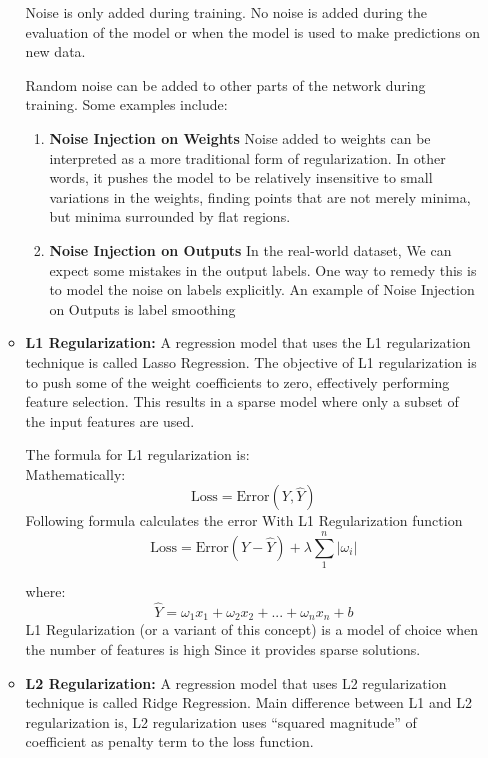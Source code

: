 \begin{itemize}
\begin{itemize}
    Noise is only added during training. No noise is added during the evaluation of the model or when the model is used to make predictions on new data.
    
    Random noise can be added to other parts of the network during training. Some examples include:
    
    \begin{enumerate}
        \item \textbf{Noise Injection on Weights}  Noise added to weights can be interpreted as a more traditional form of regularization.
        In other words, it pushes the model to be relatively insensitive to small variations in the weights, finding points that are not merely minima, but minima surrounded by flat regions.
        \item \textbf{Noise Injection on Outputs}  In the real-world dataset, We can expect some mistakes in the output labels. One way to remedy this is to model the noise on labels explicitly.
        An example of Noise Injection on Outputs is label smoothing
    \end{enumerate}
    \item \textbf{L1 Regularization: } A regression model that uses the L1 regularization technique is called Lasso Regression. The objective of L1 regularization is to push some of the weight coefficients to zero, effectively performing feature selection. This results in a sparse model where only a subset of the input features are used. \cite{kukavcka2017regularization}

    The formula for L1 regularization is:\\
    Mathematically:\\
    
    \[
    \text{Loss}=\text{Error}(Y,\hat{Y})
    \]
    Following formula calculates the error With L1 Regularization function
    \[
    \text{Loss}=\text{Error}(Y-\hat{Y}) + \lambda\sum_{1}^{n}|\omega_{i}|
    \]
    
    where:\\
    \[
    \hat{Y}=\omega_{1} x_{1}+\omega_{2} x_{2}+...+\omega_{n}x_{n}+b
    \]
    L1 Regularization (or a variant of this concept) is a model of choice when the number of features is high Since it provides sparse solutions.\\
    \item \textbf{L2 Regularization: } A regression model that uses L2 regularization technique is called Ridge Regression. Main difference between L1 and L2 regularization is, L2 regularization uses “squared magnitude” of coefficient as penalty term to the loss function. \cite{kukavcka2017regularization}


\end{itemize}
\end{itemize}
